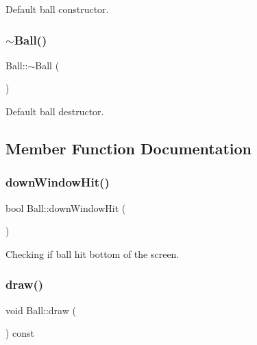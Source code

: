 Default ball constructor. 

\mbox{\label{class_ball_a20f2f6ac0bf648f406a8e12e63429fcd}} 
\subsubsection{\texorpdfstring{$\sim$Ball()}{~Ball()}}
{\footnotesize\ttfamily Ball\+::$\sim$\+Ball (\begin{DoxyParamCaption}{ }\end{DoxyParamCaption})\hspace{0.3cm}{\ttfamily [inline]}}



Default ball destructor. 



\subsection{Member Function Documentation}
\mbox{\label{class_ball_aa1bfb33edb1bdbe67380fe2be419ab11}} 
\subsubsection{\texorpdfstring{downWindowHit()}{downWindowHit()}}
{\footnotesize\ttfamily bool Ball\+::down\+Window\+Hit (\begin{DoxyParamCaption}\item[{sf\+::\+Vector2u}]{ }\end{DoxyParamCaption})}



Checking if ball hit bottom of the screen. 

\mbox{\label{class_ball_a278c50c66e8ea81f2178328022d742ff}} 
\subsubsection{\texorpdfstring{draw()}{draw()}}
{\footnotesize\ttfamily void Ball\+::draw (\begin{DoxyParamCaption}\item[{\mbox{\hyperlink{class_game_engine}{Game\+Engine}} $\ast$}]{ }\end{DoxyParamCaption}) const\hspace{0.3cm}{\ttfamily [virtual]}}



